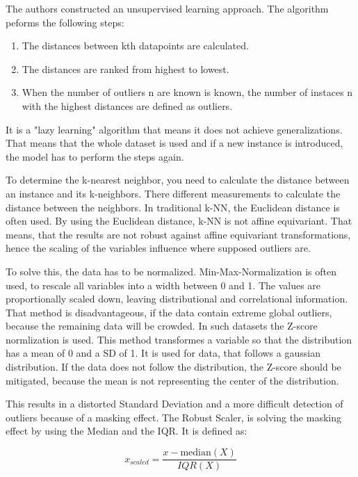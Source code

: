 The authors constructed an unsupervised learning approach.
The algorithm peforms the following steps:

\begin{enumerate}
    \item The distances between kth datapoints are calculated.
    \item The distances are ranked from highest to lowest.
    \item When the number of outliers n are known is known, the number of instaces n with the highest distances are defined as outliers.
\end{enumerate}

It is a "lazy learning" algorithm that means it does not achieve generalizations. 
That means that the whole dataset is used and if a new instance is introduced, the model has to perform the steps again.


To determine the k-nearest neighbor, you need to calculate the distance between an instance and its k-neighbors. 
There different measurements to calculate the distance between the neighbors.
In traditional k-NN, the Euclidean distance is often used. 
By using the Euclidean distance, k-NN is not affine equivariant.
That means, that the results are not robust against affine equivariant transformations, hence the scaling of the variables influence where supposed outliers are.


To solve this, the data has to be normalized. 
Min-Max-Normalization is often used, to rescale all variables into a width between 0 and 1.
The values are proportionally scaled down, leaving distributional and correlational information.
That method is disadvantageous, if the data contain extreme global outliers, because the remaining data will be crowded.
In such datasets the Z-score normlization is used.
This method transformes a variable so that the distribution has a mean of 0 and a SD of 1. 
It is used for data, that follows a gaussian distribution.  
If the data does not follow the distribution, the Z-score should be mitigated, because the mean is not representing the center of the distribution.


This results in a distorted Standard Deviation and a more difficult detection of outliers because of a masking effect.
The Robust Scaler, is solving the masking effect by using the Median and the IQR.  
It is defined as:

\begin{equation}
    x_{scaled} = \frac{x - \text{median}(X)}{IQR(X)}
\end{equation}

